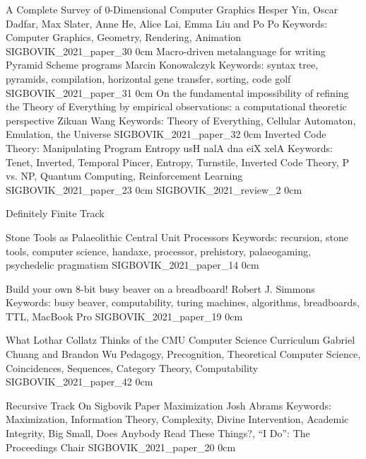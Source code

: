 \addpaper
    {A Complete Survey of 0-Dimensional Computer Graphics}
    {Hesper Yin, Oscar Dadfar, Max Slater, Anne He, Alice Lai, Emma Liu and Po Po}
    {Keywords: Computer Graphics, Geometry, Rendering, Animation}
    {SIGBOVIK_2021_paper_30}
    {0cm}
    {}
\addpaper
    {Macro-driven metalanguage for writing Pyramid Scheme programs}
    {Marcin Konowalczyk}
    {Keywords: syntax tree, pyramids, compilation, horizontal gene transfer, sorting, code golf}
    {SIGBOVIK_2021_paper_31}
    {0cm}
    {}
\addpaper
    {On the fundamental impossibility of refining the Theory of Everything by empirical observations: a computational theoretic perspective}
    {Zikuan Wang}
    {Keywords: Theory of Everything, Cellular Automaton, Emulation, the Universe}
    {SIGBOVIK_2021_paper_32}
    {0cm}
    {}
\addpaper
    {Inverted Code Theory: Manipulating Program Entropy}
    {usH nalA dna eiX xelA}
    {Keywords: Tenet, Inverted, Temporal Pincer, Entropy, Turnstile, Inverted Code Theory, P vs. NP, Quantum Computing, Reinforcement Learning}
    {SIGBOVIK_2021_paper_23}
    {0cm}
    {}
\addreview
    {SIGBOVIK_2021_review_2}
    {0cm}



\addtrack
    {}{Definitely Finite Track}


\addpaper
    {Stone Tools as Palaeolithic Central Unit Processors}
    {}
    {Keywords: recursion, stone tools, computer science, handaxe, processor, prehistory, palaeogaming, psychedelic pragmatism}
    {SIGBOVIK_2021_paper_14}
    {0cm}
    {}

\addpaper
    {Build your own 8-bit busy beaver on a breadboard!}
    {Robert J. Simmons}
    {Keywords: busy beaver, computability, turing machines, algorithms, breadboards, TTL, MacBook Pro}
    {SIGBOVIK_2021_paper_19}
    {0cm}
    {}

\addpaper
    {What Lothar Collatz Thinks of the CMU Computer Science Curriculum}
    {Gabriel Chuang and Brandon Wu}
    {Pedagogy, Precognition, Theoretical Computer Science, Coincidences, Sequences, Category Theory, Computability}
    {SIGBOVIK_2021_paper_42}
    {0cm}
    {}

\addtrack
    {}{Recursive Track}
\addpaper
    {On Sigbovik Paper Maximization}
    {Josh Abrams}
    {Keywords: Maximization, Information Theory, Complexity, Divine Intervention, Academic Integrity, Big Small, Does Anybody Read These Things?, ``I Do'': The Proceedings Chair}
    {SIGBOVIK_2021_paper_20}
    {0cm}
    {}

